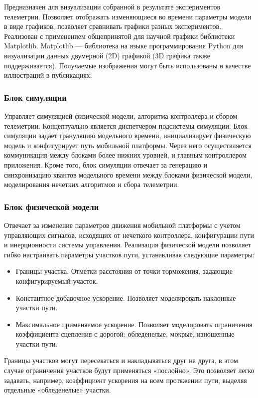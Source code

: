 Предназначен для визуализации собранной в результате экспериментов телеметрии. Позволяет отображать изменяющиеся во времени параметры модели в виде графиков, позволяет сравнивать графики разных экспериментов. Реализован с применением общепринятой для научной графики библиотеки Matplotlib. Matplotlib — библиотека на языке программирования Python для визуализации данных двумерной (2D) графикой (3D графика также поддерживается). Получаемые изображения могут быть использованы в качестве иллюстраций в публикациях.

\subsubsection{Блок симуляции} 

Управляет симуляцией физической модели, алгоритма контроллера и сбором телеметрии. Концептуально является диспетчером подсистемы симуляции. Блок симуляции задает грануляцию модельного времени, инициализирует физическую модель и конфигурирует путь мобильной платформы. Через него осуществляется коммуникация между блоками более нижних уровней, и главным контроллером приложения. Кроме того, блок симуляции отвечает за генерацию и синхронизацию квантов модельного времени между блоками физической модели, моделирования нечетких алгоритмов и сбора телеметрии.

\subsubsection{Блок физической модели} 

Отвечает за изменение параметров движения мобильной платформы с учетом управляющих сигналов, исходящих от нечеткого контроллера, конфигурации пути и инерционности системы управления. Реализация физической модели позволяет гибко настраивать параметры участков пути, устанавливая следующие параметры:

\begin{itemize}
  \item   Границы участка. Отметки расстояния от точки торможения, задающие конфигурируемый участок.
  \item   Константное добавочное ускорение. Позволяет моделировать наклонные участки пути.
  \item   Максимальное применяемое ускорение. Позволяет моделировать ограничения коэффициента сцепления с дорогой: обледенелые, мокрые, изношенные участки пути.
\end{itemize}


Границы участков могут пересекаться и накладываться друг на друга, в этом случае ограничения участков будут применяться «послойно». Это позволяет легко задавать, например, коэффициент ускорения на всем протяжении пути, выделяя отдельные «обледенелые» участки.

